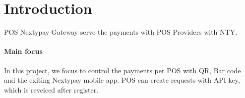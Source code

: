 \documentclass[12pt]{article}
\begin{document}
\maketitle

\section{Introduction}
POS Nextypay Gateway serve the payments with POS Providers with NTY.

\paragraph{Main focus}
In this project, we focus to control the payments per POS with QR, Bar code and the exiting Nextypay mobile app.
POS can create requests with API key, which is reveiced after register.
\end{document}

